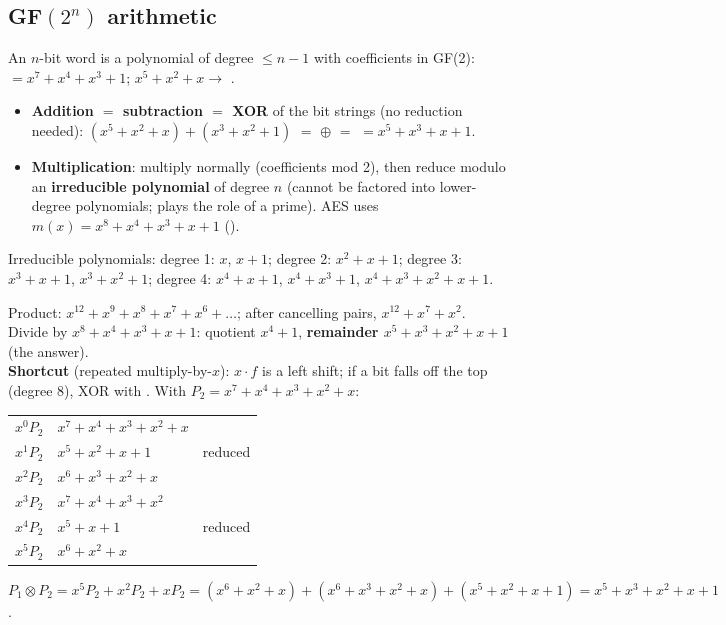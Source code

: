 \subsection{GF$(2^n)$ arithmetic}
An $n$-bit word is a polynomial of degree $\le n - 1$ with coefficients in GF(2):  $= x^7 + x^4 + x^3 + 1$; \;$x^5 + x^2 + x \to$ .
\begin{itemize}
  \item \textbf{Addition $=$ subtraction $=$ XOR} of the bit strings (no reduction needed): $(x^5 + x^2 + x) + (x^3 + x^2 + 1)$ $=$  $\oplus$  $=$  $= x^5 + x^3 + x + 1$.
  \item \textbf{Multiplication}: multiply normally (coefficients mod 2), then reduce modulo an \textbf{irreducible polynomial} of degree $n$ (cannot be factored into lower-degree polynomials; plays the role of a prime). AES uses $m(x) = x^8 + x^4 + x^3 + x + 1$ ().
\end{itemize}
Irreducible polynomials: degree 1: $x$, $x + 1$; degree 2: $x^2 + x + 1$; degree 3: $x^3 + x + 1$, $x^3 + x^2 + 1$; degree 4: $x^4 + x + 1$, $x^4 + x^3 + 1$, $x^4 + x^3 + x^2 + x + 1$.

\begin{keybox}[title={Worked: $(x^5 + x^2 + x) \otimes (x^7 + x^4 + x^3 + x^2 + x)$ in GF$(2^8)$}]
Product: $x^{12} + x^9 + x^8 + x^7 + x^6 + \dots$; after cancelling pairs, $x^{12} + x^7 + x^2$.\\
Divide by $x^8 + x^4 + x^3 + x + 1$: quotient $x^4 + 1$, \textbf{remainder $x^5 + x^3 + x^2 + x + 1$} (the answer).\\
\textbf{Shortcut} (repeated multiply-by-$x$): $x \cdot f$ is a left shift; if a bit falls off the top (degree 8), XOR with . With $P_2 = x^7 + x^4 + x^3 + x^2 + x$:
\begin{center}\small
\begin{tabular}{@{}lll@{}}
$x^0 P_2$ & $x^7 + x^4 + x^3 + x^2 + x$ & \\
$x^1 P_2$ & $x^5 + x^2 + x + 1$ & reduced\\
$x^2 P_2$ & $x^6 + x^3 + x^2 + x$ & \\
$x^3 P_2$ & $x^7 + x^4 + x^3 + x^2$ & \\
$x^4 P_2$ & $x^5 + x + 1$ & reduced\\
$x^5 P_2$ & $x^6 + x^2 + x$ & \\
\end{tabular}
\end{center}
$P_1 \otimes P_2 = x^5P_2 + x^2P_2 + xP_2 = (x^6 + x^2 + x) + (x^6 + x^3 + x^2 + x) + (x^5 + x^2 + x + 1) = x^5 + x^3 + x^2 + x + 1$ \checkmark.
\end{keybox}

